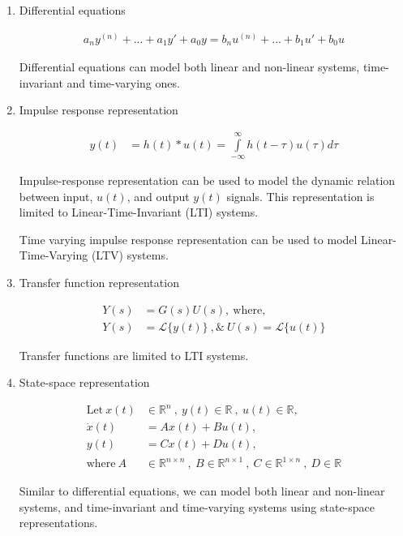 \documentclass[twoside]{article}
\begin{document}
\begin{enumerate}
  \item Differential equations

\begin{align*}
a_n  y^{(n)} + ... + a_1 y' + a_0 y = b_{n}  u^{(n)} + ... + b_1 u' + b_0 u 
\end{align*}

Differential equations can model both linear and non-linear systems,
time-invariant and time-varying ones. 

  \item Impulse response representation

\begin{align*}
  y(t) &= h(t) \ast u(t) = \int\limits_{-\infty}^{\infty} h(t-\tau) u(\tau) d\tau 
\end{align*}

Impulse-response representation can be used to model the dynamic
relation between input, $u(t)$, and output $y(t)$ signals. 
This representation is limited to Linear-Time-Invariant (LTI) systems. 

\par

Time varying impulse response representation can be used to model 
Linear-Time-Varying (LTV) systems.

\item Transfer function representation 

\begin{align*}
  Y(s) &= G(s) U(s) , \ \mathrm{where}  , \\
  Y(s) &= \mathcal{L}\lbrace y(t) \rbrace \ , \& \   
  U(s) = \mathcal{L}\lbrace u(t) \rbrace
\end{align*}

Transfer functions are limited to LTI systems. 

\item State-space representation

\begin{align*}
  \mathrm{Let} \ x(t) &\in \mathbb{R}^n \ , \ y(t) \in \mathbb{R} \ ,\  u(t) \in
  \mathbb{R} , \\
  \dot{x}(t) &= A x(t) + B u(t) , \\
  y(t) &= C x(t) + D u(t) , \\
  \mathrm{where} \ A &\in \mathbb{R}^{n \times n} \ , \ 
    B \in \mathbb{R}^{n \times 1} \ ,\  C \in \mathbb{R}^{1 \times n} \ , \ D \in \mathbb{R}
\end{align*}

Similar to differential equations, we can model both linear and non-linear systems,
and time-invariant and time-varying systems using state-space representations.

\end{enumerate}
\end{document}
